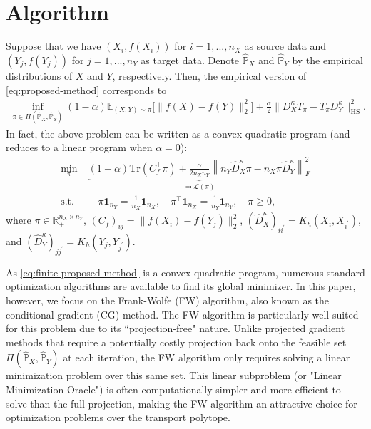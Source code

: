 \documentclass{article}
\begin{document}
\section{Algorithm}
Suppose that we have $(X_i,f(X_i))$ for $i=1,...,n_X$ as source data and $(Y_j,f(Y_j))$ for $j=1,...,n_Y$ as target data. Denote $\hat{\mathbb{P}}_X$ and $\hat{\mathbb{P}}_Y$ by the empirical distributions of $X$ and $Y$, respectively. Then, the empirical version of \eqref{eq:proposed-method} corresponds to
\begin{align*}
	\inf_{\pi \in \Pi(\hat{\mathbb{P}}_X,\hat{\mathbb{P}}_Y)} (1-\alpha)\mathbb{E}_{(X,Y)\sim\pi}\big[\|f(X)-f(Y)\|_2^2\big] + \frac{\alpha}{2} \| D_X^{\kappa}T_\pi - T_\pi D_Y^{\kappa} \|_{\mathrm{HS}}^2 .
\end{align*}
In fact, the above problem can be written as a convex quadratic program (and reduces to a linear program when $\alpha = 0$):
\begin{align}
	\label{eq:finite-proposed-method}
	\min_{\pi}\; &\underbrace{(1-\alpha)\mathrm{Tr}\left(C_f^\top \pi\right) + \frac{\alpha}{2n_Xn_Y} \left\| n_Y \hat{D}^{\kappa}_X \pi - n_X \pi \hat{D}^{\kappa}_Y \right\|_F^2}_{\eqqcolon \mathcal{L}(\pi)} \nonumber\\
	\mathrm{s.t.}&\quad \pi\mathbf{1}_{n_Y} = \frac{1}{n_X} \mathbf{1}_{n_X} , \quad \pi^\top \mathbf{1}_{n_X} = \frac{1}{n_Y} \mathbf{1}_{n_Y} , \quad \pi \geq 0 ,
\end{align}
where $\pi \in \mathbb{R}_{+}^{n_X \times n_Y}$, $(C_f)_{ij} = \|f(X_i) - f(Y_j)\|_2^2$, $(\hat{D}^{\kappa}_X)_{ii^\prime} = K_h(X_i,X_{i^\prime})$, and $(\hat{D}^{\kappa}_Y)_{jj^\prime} = K_h(Y_j,Y_{j^\prime})$.

As \eqref{eq:finite-proposed-method} is a convex quadratic program, numerous standard optimization algorithms are available to find its global minimizer. In this paper, however, we focus on the Frank-Wolfe (FW) algorithm, also known as the conditional gradient (CG) method. The FW algorithm is particularly well-suited for this problem due to its ``projection-free" nature. Unlike projected gradient methods that require a potentially costly projection back onto the feasible set $\Pi(\hat{\mathbb{P}}_X,\hat{\mathbb{P}}_Y)$ at each iteration, the FW algorithm only requires solving a linear minimization problem over this same set. This linear subproblem (or "Linear Minimization Oracle") is often computationally simpler and more efficient to solve than the full projection, making the FW algorithm an attractive choice for optimization problems over the transport polytope.
\end{document}
